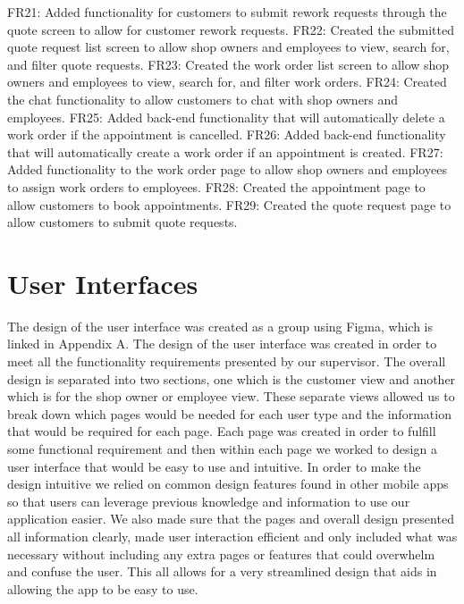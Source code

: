 \documentclass[12pt, titlepage]{article}
\begin{document}
\newline
FR21: Added functionality for customers to submit rework requests through the quote screen to allow for customer rework requests.
\newline
FR22: Created the submitted quote request list screen to allow shop owners and employees to view, search for, and filter quote requests.
\newline
FR23: Created the work order list screen to allow shop owners and employees to view, search for, and filter work orders.
\newline
FR24: Created the chat functionality to allow customers to chat with shop owners and employees.
\newline
FR25: Added back-end functionality that will automatically delete a work order if the appointment is cancelled.
\newline
FR26: Added back-end functionality that will automatically create a work order if an appointment is created.
\newline
FR27: Added functionality to the work order page to allow shop owners and employees to assign work orders to employees.
\newline
FR28: Created the appointment page to allow customers to book appointments.
\newline
FR29: Created the quote request page to allow customers to submit quote requests.

\section{User Interfaces}

\noindent
The design of the user interface was created as a group using Figma, which is linked in Appendix A. The design of the user interface was created in order to meet all the functionality requirements presented by our supervisor. The overall design is separated into two sections, one which is the customer view and another which is for the shop owner or employee view. These separate views allowed us to break down which pages would be needed for each user type and the information that would be required for each page. Each page was created in order to fulfill some functional requirement and then within each page we worked to design a user interface that would be easy to use and intuitive. In order to make the design intuitive we relied on common design features found in other mobile apps so that users can leverage previous knowledge and information to use our application easier. We also made sure that the pages and overall design presented all information clearly, made user interaction efficient and only included what was necessary without including any extra pages or features that could overwhelm and confuse the user. This all allows for a very streamlined design that aids in allowing the app to be easy to use.
\end{document}
